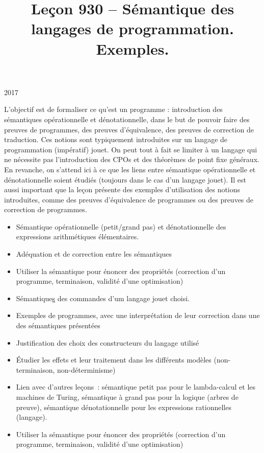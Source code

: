 \documentclass{agregfiche}
\title{Leçon 930 -- Sémantique des langages de programmation. Exemples.}
\begin{document}
\maketitle

\secrapports

\begin{rapport}{2017}

    L’objectif est de formaliser ce qu’est un programme : introduction des
    sémantiques opérationnelle et dénotationnelle, dans le but de pouvoir faire
    des preuves de programmes, des preuves d’équivalence, des preuves de
    correction de traduction. Ces notions sont typiquement introduites sur un
    langage de programmation (impératif) jouet. On peut tout à fait se limiter à
    un langage qui ne nécessite pas l’introduction des CPOs et des théorèmes de
    point fixe généraux. En revanche, on s’attend ici à ce que les liens entre
    sémantique opérationnelle et dénotationnelle soient étudiés (toujours dans le
    cas d’un langage jouet). Il est aussi important que la leçon présente des
    exemples d’utilisation des notions introduites, comme des preuves
    d’équivalence de programmes ou des preuves de correction de programmes.

\end{rapport}

\secindispensables

\begin{itemize}
    \item Sémantique opérationnelle (petit/grand pas) et dénotationnelle
        des expressions arithmétiques élémentaires.
    \item Adéquation et de correction entre les 
        sémantiques
    \item Utiliser la sémantique pour énoncer des propriétés (correction d'un
        programme, terminaison, validité d'une optimisation)
\end{itemize}

\secasavoir

\begin{itemize}
	\item Sémantique\underline{s} des commandes d'um langage jouet choisi.

	\item Exemples de programmes, avec une interprétation de leur 
	correction dans une des sémantiques présentées
	\item Justification des choix des constructeurs du langage utilisé
	\item Étudier les effets et leur traitement dans les différents modèles 
	(non-terminaison, non-déterminisme)
	\item Lien avec d'autres leçons~: 
	sémantique petit pas pour le lambda-calcul et les machines de Turing,
	sémantique à grand pas pour la logique (arbres de preuve),
	sémantique dénotationnelle pour les expressions rationnelles (langage).
	\item Utiliser la sémantique pour énoncer des propriétés (correction d'un
	programme, terminaison, validité d'une optimisation)
\end{itemize}
\end{document}
